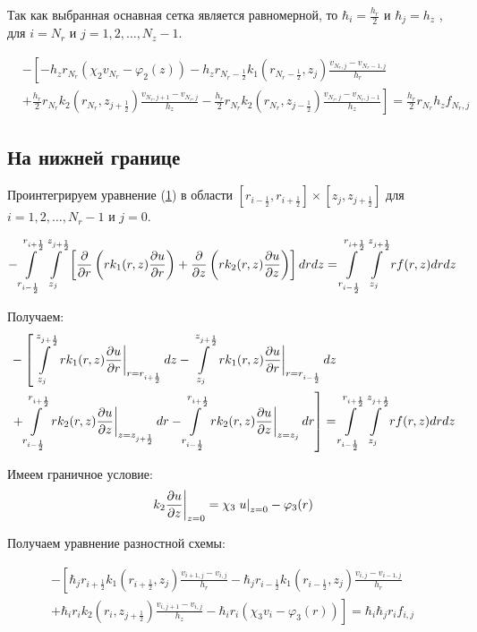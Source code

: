 Так как выбранная оснавная сетка является равномерной, то $ \hbar_i = \frac{h_r}{2} $ и $ \hbar_j = h_z$
, для $ i = N_r $ и $ j = 1,2, \dots, N_z-1 $.

\begin{align*}
  &- \left [ 
  -h_z r_{N_r} ( \chi_2 v_{N_r} - \varphi_2(z))
  - h_z r_{N_r-\frac{1}{2}} k_1(r_{N_r-\frac{1}{2}}, z_j) \frac{v_{N_r, j} - v_{N_r - 1, j}}{h_{r}}
  \right . \\
  &\left .
  + \frac{h_r}{2} r_{N_r} k_2(r_{N_r}, z_{j+\frac{1}{2}}) \frac{v_{N_r, j + 1} - v_{N_r, j}}{h_{z}}
  - \frac{h_r}{2} r_{N_r} k_2(r_{N_r}, z_{j-\frac{1}{2}}) \frac{v_{N_r, j} - v_{N_r, j - 1}}{h_z}
  \right ]  = \frac{h_r}{2} r_{N_r} h_z f_{N_r, j}
\end{align*}

\subsection{На нижней границе}
Проинтегрируем уравнение (\hyperref[eq1]{1}) в области
$ [r_{i  -\frac{1}{2}}, r_{i +\frac{1}{2}}] \times  [z_{j}, z_{j +\frac{1}{2}}] $
для $ i = 1, 2, \dots, N_r - 1 $ и $ j = 0$.

\[
  - \int\limits^{r_{i +\frac{1}{2}}}_{r_{i -\frac{1}{2}}} \int\limits^{z_{j +\frac{1}{2}}}_{z_{j }} \left [ \pdv{}{r} \left ( r k_1(r, z) \pdv{u}{r} \right ) 
  + \pdv{}{z} \left ( rk_2(r, z)\pdv{u}{z} \right ) \right ] drdz = \int\limits^{r_{i +\frac{1}{2}}}_{r_{i -\frac{1}{2}}} \int\limits^{z_{j +\frac{1}{2}}}_{z_{j }} rf(r, z) dr dz
\]

Получаем:
\begin{align*}
  &- \left [
   \int\limits^{z_{j +\frac{1}{2}}}_{z_{j }}  \left . r k_1(r, z) \pdv{u}{r} \right \vert_{r = r_{i + \frac{1}{2}}} dz
  - \int\limits^{z_{j +\frac{1}{2}}}_{z_{j }} \left . r k_1(r, z) \pdv{u}{r} \right \vert_{r = r_{i - \frac{1}{2}}} dz
  \right . \\
  &\left . + \int\limits^{r_{i+\frac{1}{2}}}_{r_{i-\frac{1}{2}}} \left . rk_2(r, z)\pdv{u}{z} \right \vert_{z = z_{j + \frac{1}{2}}} dr
  - \int\limits^{r_{i+\frac{1}{2}}}_{r_{i-\frac{1}{2}}} \left . rk_2(r, z)\pdv{u}{z} \right \vert_{z = z_{j}} dr
  \right ] = \int\limits^{r_{i +\frac{1}{2}}}_{r_{i -\frac{1}{2}}} \int\limits^{z_{j +\frac{1}{2}}}_{z_{j }} rf(r, z) dr dz
\end{align*}

Имеем граничное условие:
\[
  \left . k_2 \pdv{u}{z} \right \vert_{z=0} = \chi_3 \left . u \right \vert_{z=0} - \varphi_3(r)
\]

Получаем уравнение разностной схемы:

\begin{align*}
  - \left [ 
  \hbar_j r_{i+\frac{1}{2}} k_1(r_{i+\frac{1}{2}}, z_j) \frac{v_{i+1, j} - v_{i, j}}{h_{r}}
  - \hbar_j r_{i-\frac{1}{2}} k_1(r_{i-\frac{1}{2}}, z_j) \frac{v_{i, j} - v_{i - 1, j}}{h_{r}}
  \right . \\
  \left .
  + \hbar_i r_{i} k_2(r_i, z_{j+\frac{1}{2}}) \frac{v_{i, j + 1} - v_{i, j}}{h_{z}}
  - \hbar_i r_i (\chi_3 v_i - \varphi_3(r))
  \right ]  = \hbar_i \hbar_j r_i f_{i, j}
\end{align*}

